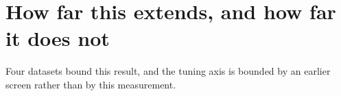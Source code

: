 
\section{How far this extends, and how far it does not}
\label{apx:cosine:extension}

Four datasets bound this result, and the tuning axis is bounded by an earlier screen rather than by
this measurement.

